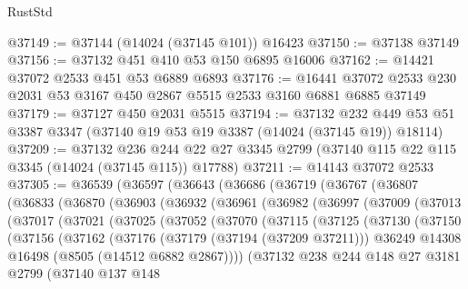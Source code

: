 \begin{lexlean}{RustStd}
\begin{coremodule}
@37149 := @37144 (@14024 (@37145 @101)) @16423
@37150 := @37138 @37149
@37156 := @37132 @451 @410 @53 @150 @6895 @16006
@37162 := @14421 @37072 @2533 @451 @53 @6889 @6893
@37176 := @16441 @37072 @2533 @230 @2031 @53 @3167 @450 @2867 @5515 @2533 @3160 @6881 @6885 @37149
@37179 := @37127 @450 @2031 @5515
@37194 := @37132
    @232
    @449
    @53
    @51
    @3387
    @3347
    (@37140 @19 @53 @19 @3387 (@14024 (@37145 @19)) @18114)
@37209 := @37132
    @236
    @244
    @22
    @27
    @3345
    @2799
    (@37140 @115 @22 @115 @3345 (@14024 (@37145 @115)) @17788)
@37211 := @14143 @37072 @2533
@37305 := @36539
    (@36597
      (@36643
        (@36686
          (@36719
            (@36767
              (@36807
                (@36833
                  (@36870
                    (@36903
                      (@36932
                        (@36961
                          (@36982
                            (@36997
                              (@37009
                                (@37013
                                  (@37017
                                    (@37021
                                      (@37025
                                        (@37052
                                          (@37070
                                            (@37115
                                              (@37125
                                                (@37130
                                                  (@37150
                                                    (@37156
                                                      (@37162
                                                        (@37176
                                                          (@37179 (@37194 (@37209 @37211)))
                                                          @36249
                                                          @14308
                                                          @16498
                                                          (@8505 (@14512 @6882 @2867))))
                                                      (@37132
                                                        @238
                                                        @244
                                                        @148
                                                        @27
                                                        @3181
                                                        @2799
                                                        (@37140
                                                          @137
                                                          @148

\end{coremodule}
\end{lexlean}
